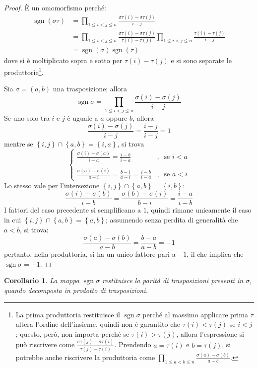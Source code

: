 \documentclass[11pt]{article}
\theoremstyle{style}
\newtheorem{corollario}{Corollario}[teorema]
\numberwithin{equation}{subsection}
\begin{document}
	\begin{proof}
		\`E un omomorfismo perch\'e:
		\[
			\begin{split}
				\operatorname{sgn} (\sigma \tau )&= \prod_{1\le i<j\le n} \frac{\sigma \tau (i)-\sigma \tau (j)}{i-j} \\
								 &=\prod_{1\le i<j\le n} \frac{\sigma \tau (i) - \sigma \tau (j)}{\tau (i) -\tau (j)}\prod_{1\le i<j\le n} \frac{\tau (i) - \tau (j)}{i - j}\\
								 &= \operatorname{sgn} (\sigma) \operatorname{sgn} (\tau)
			\end{split}
		\] 
		dove si \`e moltiplicato sopra e sotto per $\tau (i)-\tau (j)$ e si sono separate le produttorie\footnote{La prima produttoria restituisce il $\operatorname{sgn} \sigma $ perch\'e al massimo applicare prima $\tau $ altera l'ordine dell'insieme, quindi non \`e garantito che $\tau (i)< \tau (j)$ se $i<j$; questo, per\`o, non importa perch\'e se $\tau (i)>\tau (j)$, allora l'espressione si pu\`o riscrivere come $\frac{\sigma \tau (j) - \sigma \tau (i)}{\tau (j)-\tau (i)}$. Prendendo $a=\tau (i)$ e $b=\tau (j)$, si potrebbe anche riscrivere la produttoria come $\prod_{1\le a<b\le n} \frac{\sigma (a)-\sigma (b)}{a-b}$.}.

		Sia $\sigma =(a,b)$ una trasposizione; allora
		\[
		\operatorname{sgn} \sigma  = \prod_{1\le i<j\le n} \frac{\sigma (i)-\sigma (j)}{i-j}
		\] 
		Se uno solo tra $i$ e $j$ \`e uguale a $a$ oppure $b$, allora
		\[
		\frac{\sigma (i)-\sigma (j)}{i-j}=\frac{i-j}{i-j}=1
		\] 
		mentre se $\left\{ i,j \right\} \cap \left\{ a,b \right\} = \left\{ i,a \right\} $, si trova
		\[
			\begin{cases}
	\displaystyle 			\frac{\sigma (i) - \sigma (a)}{i-a} = \frac{i-b}{i-a}&,\ \text{ se } i<a\\
	\\
	\displaystyle \frac{\sigma (a) -\sigma (i)}{a-i}=\frac{b-i}{a-i}= \frac{i-b}{i-a}&,\ \text{ se } a < i
			\end{cases}
		\] 
		Lo stesso vale per l'intersezione $\left\{ i,j \right\} \cap \left\{ a,b \right\} = \left\{ i,b \right\} $:
		\[
		\frac{\sigma (i)-\sigma (b)}{i-b}=\frac{\sigma (b)-\sigma (i)}{b-i}=\frac{i-a}{i-b}
		\] 
		I fattori del caso precedente si semplificano a $1$, quindi rimane unicamente il caso in cui $\left\{ i,j \right\} \cap \left\{ a,b \right\} = \left\{ a,b \right\} $; assumendo senza perdita di generalit\`a che $a<b$, si trova:
		\[
		\frac{\sigma (a)-\sigma (b)}{a-b}=\frac{b-a}{a-b}=-1
		\] 
		pertanto, nella produttoria, si ha un unico fattore pari a $-1$, il che implica che $\operatorname{sgn} \sigma =-1$.
	\end{proof}
\begin{corollario}
	La mappa $\operatorname{sgn} \sigma $ restituisce la parit\`a di trasposizioni presenti in $\sigma $, quando decomposta in prodotto di trasposizioni.
\end{corollario}
\end{document}
